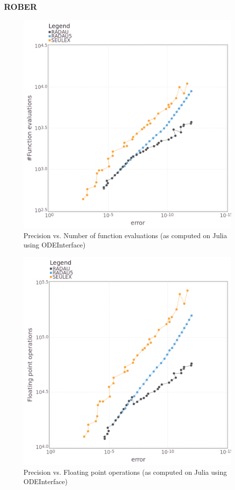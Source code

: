 \documentclass[notitlepage,12pt]{article}
\begin{document}
\subsubsection{ROBER}
\begin{figure}[H]
\centering
\includegraphics[scale=0.4]{../ImagesAndPDFs/Plots/RoberPrecisionTest.png}
\caption{Precision vs. Number of function evaluations (as computed on Julia using ODEInterface)}
\label{fig:roberJulia}
\end{figure}

\begin{figure}[H]
\centering
\includegraphics[scale=0.4]{../ImagesAndPDFs/Plots/RoberPrecisionTestFlops.png}
\caption{Precision vs. Floating point operations (as computed on Julia using ODEInterface)}
\label{fig:roberJulia}
\end{figure}
\end{document}
